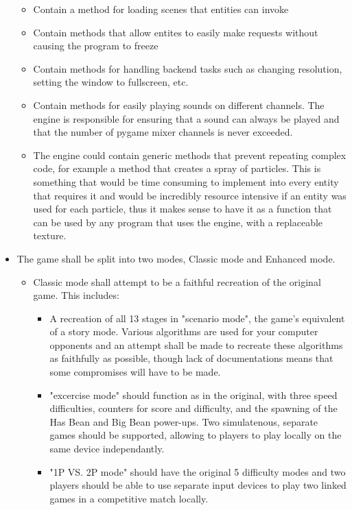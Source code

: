 \documentclass{report}
\begin{document}
\begin{itemize}
\begin{itemize}
\begin{itemize}
            \end{itemize}
        \item Contain a method for loading scenes that entities can invoke
        \item Contain methods that allow entites to easily make requests without causing the program to freeze
        \item Contain methods for handling backend tasks such as changing resolution, setting the window to fullscreen, etc.
        \item Contain methods for easily playing sounds on different channels. The engine is responsible for ensuring that a sound can always be played and that the number of pygame mixer channels is never exceeded.
        \item The engine could contain generic methods that prevent repeating complex code, for example a method that creates a spray of particles. This is something that would be time consuming to implement into every entity that requires it and would be incredibly resource intensive if an entity was used for each particle, thus it makes sense to have it as a function that can be used by any program that uses the engine, with a replaceable texture.
    \end{itemize}
    \item The game shall be split into two modes, Classic mode and Enhanced mode.
    \begin{itemize}
        \item Classic mode shall attempt to be a faithful recreation of the original game. This includes:
        \begin{itemize}
            \item A recreation of all 13 stages in "scenario mode", the game's equivalent of a story mode. Various algorithms are used for your computer opponents and an attempt shall be made to recreate these algorithms as faithfully as possible, though lack of documentations means that some compromises will have to be made.
            \item "excercise mode" should function as in the original, with three speed difficulties, counters for score and difficulty, and the spawning of the Has Bean and Big Bean power-ups. Two simulatenous, separate games should be supported, allowing to players to play locally on the same device independantly.
            \item "1P VS. 2P mode" should have the original 5 difficulty modes and two players should be able to use separate input devices to play two linked games in a competitive match locally.

\end{itemize}
\end{itemize}
\end{itemize}
\end{document}
